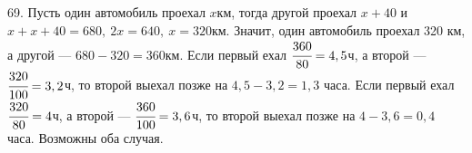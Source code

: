 69. Пусть один автомобиль проехал $x$км, тогда другой проехал $x+40$ и $x+x+40=680,\ 2x=640,\ x=320$км. Значит, один автомобиль проехал 320 км, а другой --- $680-320=360$км. Если первый ехал $\cfrac{360}{80}=4,5$ч, а второй --- $\cfrac{320}{100}=3,2$ч, то второй выехал позже на $4,5-3,2=1,3$ часа. Если первый ехал $\cfrac{320}{80}=4$ч, а второй --- $\cfrac{360}{100}=3,6$ч, то второй выехал позже на $4-3,6=0,4$ часа. Возможны оба случая.\\
